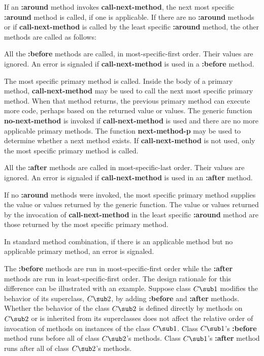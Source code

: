 \item{\bull} 
If an {\bf :around} method invokes {\bf call-next-method}, the next
most specific {\bf :around} method is called, if one is applicable.
If there are no {\bf :around} methods or if {\bf
call-next-method} is called by the least specific {\bf :around}
method, the other methods are called as follows:

\itemitem{--} All the {\bf :before} methods are called, in
most-specific-first order.  Their values are ignored.
An error is signaled if {\bf call-next-method} is used in a
{\bf :before} method.

\itemitem{--} The most specific primary method is called.  Inside the
body of a primary method, {\bf call-next-method} may be used to call
the next most specific primary method.  When that method returns, the
previous primary method can execute more code, perhaps based on the
returned value or values.  The generic function {\bf no-next-method}
is invoked if {\bf call-next-method} is used and there are no more
applicable primary methods.  The function {\bf next-method-p} may be
used to determine whether a next method exists.  If {\bf
call-next-method} is not used, only the most specific primary method
is called.


\itemitem{--} All the {\bf :after} methods are called in
most-specific-last order.  Their values are ignored.
An error is signaled if {\bf call-next-method} is used in an
{\bf :after} method.

\item{\bull} If no {\bf :around} methods were invoked, the most
specific primary method supplies the value or values returned by the
generic function.  The value or values returned by the invocation of
{\bf call-next-method} in the least specific {\bf :around} method are
those returned by the most specific primary method.

\endlist

In standard method combination, if there is an applicable method
but no applicable primary method, an error is signaled.

The {\bf :before} methods are run in most-specific-first order while
the {\bf :after} methods are run in least-specific-first order.  The
design rationale for this difference can be illustrated with an
example.  Suppose class $C \sub 1$ modifies the behavior of its
superclass, $C \sub 2$, by adding {\bf :before} and {\bf :after}
methods. Whether the behavior of the class $C\sub 2$ is defined
directly by methods on $C\sub 2$ or is inherited from its superclasses
does not affect the relative order of invocation of methods on
instances of the class $C\sub 1$.  Class $C \sub 1$'s {\bf :before}
method runs before all of class $C \sub 2$'s methods.  Class $C \sub
1$'s {\bf :after} method runs after all of class $C \sub 2$'s methods.

